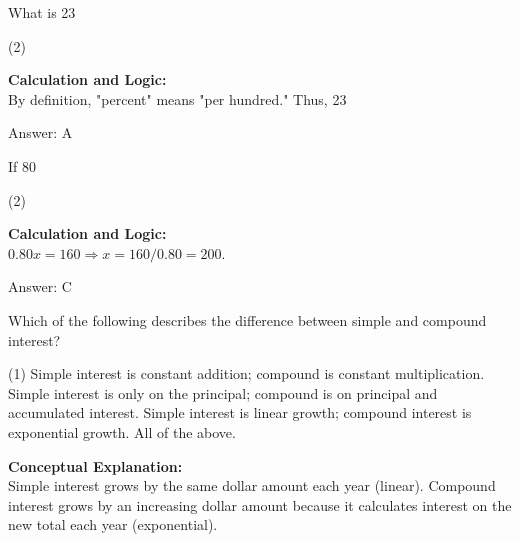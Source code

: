 \documentclass[11pt,paper=a4,answers]{exam}
\begin{document}
\begin{questions}
\vspace{60pt}

\question
What is 23%
\begin{tasks}(2)
\end{tasks}

\begin{solution}
\textbf{Calculation and Logic:} \\
By definition, "percent" means "per hundred." Thus, 23%

\vspace{30pt}

Answer: \colorbox{yellow!100}{A}
\end{solution}

\vspace{60pt}

\question
If 80%
\begin{tasks}(2)
\end{tasks}

\begin{solution}
\textbf{Calculation and Logic:} \\
$0.80x = 160 \Rightarrow x = 160 / 0.80 = 200$.

\vspace{30pt}

Answer: \colorbox{yellow!100}{C}
\end{solution}

\vspace{60pt}

\question
Which of the following describes the difference between simple and compound interest?
\begin{tasks}(1)
    \task Simple interest is constant addition; compound is constant multiplication.
    \task Simple interest is only on the principal; compound is on principal and accumulated interest.
    \task Simple interest is linear growth; compound interest is exponential growth.
    \task All of the above.
\end{tasks}

\begin{solution}
\textbf{Conceptual Explanation:} \\
Simple interest grows by the same dollar amount each year (linear). Compound interest grows by an increasing dollar amount because it calculates interest on the new total each year (exponential).


\end{solution}
\end{questions}
\end{document}
